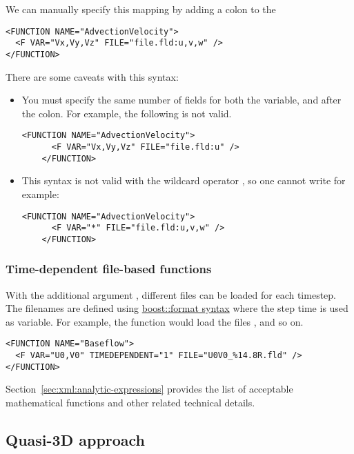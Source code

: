 We can manually specify this mapping by adding a colon to the

\begin{lstlisting}[style=XMLStyle]
<FUNCTION NAME="AdvectionVelocity">
  <F VAR="Vx,Vy,Vz" FILE="file.fld:u,v,w" />
</FUNCTION>
\end{lstlisting}

There are some caveats with this syntax:

\begin{itemize}
  \item You must specify the same number of fields for both the variable, and
  after the colon. For example, the following is not valid.
  \begin{lstlisting}[style=XMLStyle,gobble=4]
    <FUNCTION NAME="AdvectionVelocity">
      <F VAR="Vx,Vy,Vz" FILE="file.fld:u" />
    </FUNCTION>\end{lstlisting}
  \item This syntax is not valid with the wildcard operator \inltt{*}, so one
  cannot write for example:
  \begin{lstlisting}[style=XMLStyle,gobble=4]
    <FUNCTION NAME="AdvectionVelocity">
      <F VAR="*" FILE="file.fld:u,v,w" />
    </FUNCTION>
  \end{lstlisting}
\end{itemize}

\subsubsection{Time-dependent file-based functions}

With the additional argument , different files can be
loaded for each timestep. The filenames are defined using
\href{http://www.boost.org/doc/libs/1_56_0/libs/format/doc/format.html#syntax}{boost::format
  syntax} where the step time is used as variable. For example, the function
 would load the files ,
 and so on.

\begin{lstlisting}[style=XMLStyle]
<FUNCTION NAME="Baseflow">
  <F VAR="U0,V0" TIMEDEPENDENT="1" FILE="U0V0_%14.8R.fld" />
</FUNCTION>
\end{lstlisting}

Section~\ref{sec:xml:analytic-expressions} provides the list of acceptable
mathematical functions and other related technical details.

\subsection{Quasi-3D approach}

